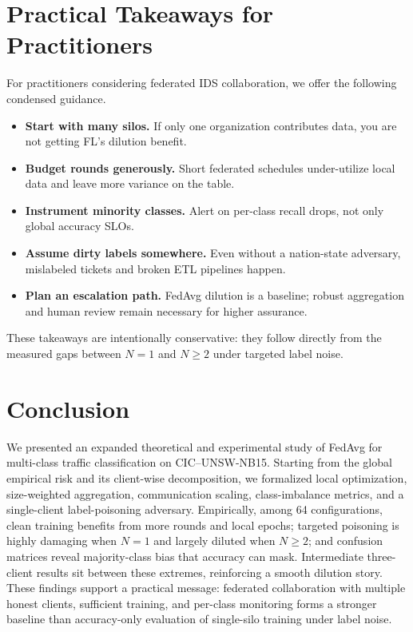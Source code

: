 \documentclass[journal]{IEEEtran}
\begin{document}
\section{Practical Takeaways for Practitioners}
\label{sec:takeaways}
For practitioners considering federated IDS collaboration, we offer the following condensed guidance.
\begin{itemize}
\item \textbf{Start with many silos.} If only one organization contributes data, you are not getting FL's dilution benefit.
\item \textbf{Budget rounds generously.} Short federated schedules under-utilize local data and leave more variance on the table.
\item \textbf{Instrument minority classes.} Alert on per-class recall drops, not only global accuracy SLOs.
\item \textbf{Assume dirty labels somewhere.} Even without a nation-state adversary, mislabeled tickets and broken ETL pipelines happen.
\item \textbf{Plan an escalation path.} FedAvg dilution is a baseline; robust aggregation and human review remain necessary for higher assurance.
\end{itemize}
These takeaways are intentionally conservative: they follow directly from the measured gaps between $N=1$ and $N\ge 2$ under targeted label noise.

\section{Conclusion}
\label{sec:conclusion}

We presented an expanded theoretical and experimental study of FedAvg for multi-class traffic classification on CIC--UNSW-NB15. Starting from the global empirical risk and its client-wise decomposition, we formalized local optimization, size-weighted aggregation, communication scaling, class-imbalance metrics, and a single-client label-poisoning adversary. Empirically, among 64 configurations, clean training benefits from more rounds and local epochs; targeted poisoning is highly damaging when $N=1$ and largely diluted when $N\ge 2$; and confusion matrices reveal majority-class bias that accuracy can mask. Intermediate three-client results sit between these extremes, reinforcing a smooth dilution story. These findings support a practical message: federated collaboration with multiple honest clients, sufficient training, and per-class monitoring forms a stronger baseline than accuracy-only evaluation of single-silo training under label noise.
\end{document}
